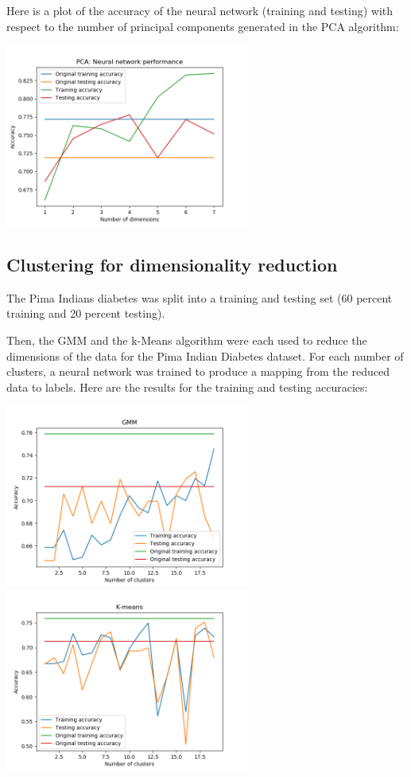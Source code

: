 \documentclass[11pt]{article}
\begin{document}
            Here is a plot of the accuracy of the neural network (training and testing) with
            respect to the number of principal components generated in the
            PCA algorithm:

            \includegraphics[width=8cm]{../pima/nn_pca/nn_pca.png}

            \subsection{Clustering for dimensionality reduction}

            The Pima Indians diabetes was split into a training and testing set (60
            percent training and 20 percent testing).

            Then, the GMM and the k-Means algorithm were each used to reduce the dimensions of
            the data for the Pima Indian Diabetes dataset. For each number of clusters,
            a neural network was trained to produce a mapping from the reduced data
            to labels. Here are the results for the training and testing
            accuracies:

            \includegraphics[width=8cm]{../pima/clustering3/gmm_acc.png}
            \includegraphics[width=8cm]{../pima/clustering3/km_acc.png}
\end{document}

